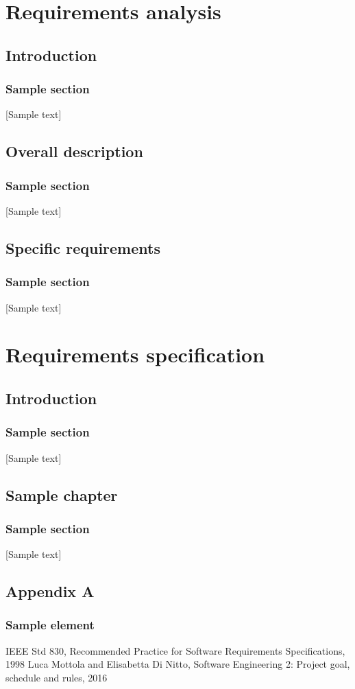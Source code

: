 \documentclass[openright]{report}
\begin{document}

    \part{Requirements analysis}
    \chapter{Introduction}
    \section{Sample section}
		[Sample text]
    \chapter{Overall description}
    \section{Sample section}
		[Sample text]
    \chapter{Specific requirements}
    \section{Sample section}
		[Sample text]

	\part{Requirements specification}
	\chapter{Introduction}
    \section{Sample section}
		[Sample text]
	\chapter{Sample chapter}
	\section{Sample section}
		[Sample text]


    \newpage
    \appendix
    \chapter{Appendix A}
    \section{Sample element}

	\newpage
	\begin{thebibliography}{10}
			IEEE Std 830, Recommended Practice for Software Requirements Specifications, 1998
			Luca Mottola and Elisabetta Di Nitto, Software Engineering 2: Project goal, schedule and rules, 2016
	\end{thebibliography}
\end{document}
